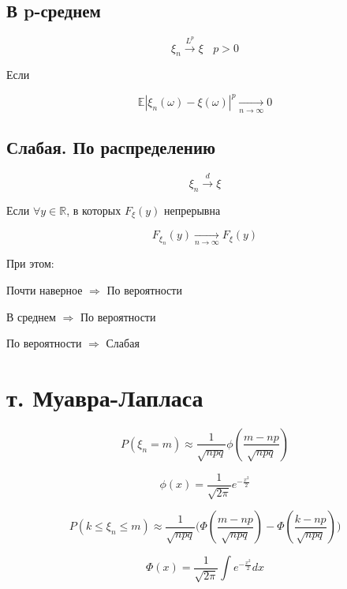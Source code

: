 \documentclass[a4paper, 14pt]{extarticle}
\begin{document}
\subsection{В p-среднем}
$$ \xi_n \overset{L^p}{\to} \xi~~~~p > 0$$

Если

$$\mathbb{E}|\xi_n(\omega)-\xi(\omega)|^p \underset{n \to \infty}{\to} 0$$

\subsection{Слабая. По распределению}
$$\xi_n \overset{d}{\to} \xi$$

Если $\forall y\in\mathbb{R}$, в которых $F_{\xi}(y)$ непрерывна

$$F_{\xi_n}(y) \underset{n \to \infty}{\to} F_{\xi}(y)$$

При этом:  

Почти наверное $\Rightarrow$ По вероятности

В среднем $\Rightarrow$ По вероятности

По вероятности $\Rightarrow$ Слабая 


\section{т. Муавра-Лапласа}

$$P(\xi_n = m)  \approx \frac{1}{\sqrt{npq}} \phi(\frac{m-np}{\sqrt{npq}})$$

$$\phi(x) = \frac{1}{\sqrt{2\pi}}e^{-\frac{x^2}{2}}$$

$$P(k \leq \xi_n \leq m)  \approx \frac{1}{\sqrt{npq}} \Big(\Phi(\frac{m-np}{\sqrt{npq}}) - \Phi(\frac{k-np}{\sqrt{npq}})\Big)$$

$$\Phi(x) = \frac{1}{\sqrt{2\pi}}\int e^{-\frac{x^2}{2}}dx$$


\end{document}
